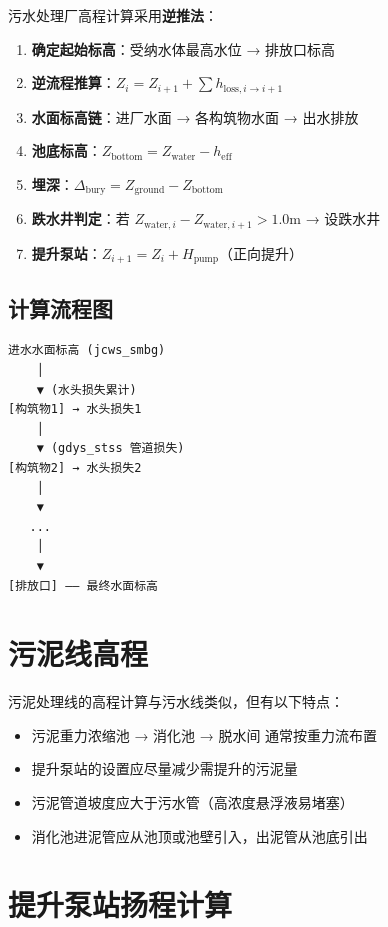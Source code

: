 \documentclass[12pt,a4paper]{ctexart}
\begin{document}
污水处理厂高程计算采用\textbf{逆推法}：

\begin{enumerate}[nosep]
    \item \textbf{确定起始标高}：受纳水体最高水位 → 排放口标高
    \item \textbf{逆流程推算}：$Z_{i} = Z_{i+1} + \sum h_{\text{loss},i\rightarrow i+1}$
    \item \textbf{水面标高链}：进厂水面 → 各构筑物水面 → 出水排放
    \item \textbf{池底标高}：$Z_{\text{bottom}} = Z_{\text{water}} - h_{\text{eff}}$
    \item \textbf{埋深}：$\Delta_{\text{bury}} = Z_{\text{ground}} - Z_{\text{bottom}}$
    \item \textbf{跌水井判定}：若 $Z_{\text{water},i} - Z_{\text{water},i+1} > 1.0$m → 设跌水井
    \item \textbf{提升泵站}：$Z_{i+1} = Z_i + H_{\text{pump}}$（正向提升）
\end{enumerate}

\subsection{计算流程图}

\begin{verbatim}
进水水面标高 (jcws_smbg)
    │
    ▼ (水头损失累计)
[构筑物1] → 水头损失1
    │
    ▼ (gdys_stss 管道损失)
[构筑物2] → 水头损失2
    │
    ▼
   ...
    │
    ▼
[排放口] —— 最终水面标高
\end{verbatim}

\section{污泥线高程}

污泥处理线的高程计算与污水线类似，但有以下特点：

\begin{itemize}[nosep]
    \item 污泥重力浓缩池 → 消化池 → 脱水间 通常按重力流布置
    \item 提升泵站的设置应尽量减少需提升的污泥量
    \item 污泥管道坡度应大于污水管（高浓度悬浮液易堵塞）
    \item 消化池进泥管应从池顶或池壁引入，出泥管从池底引出
\end{itemize}

\section{提升泵站扬程计算}
\end{document}
